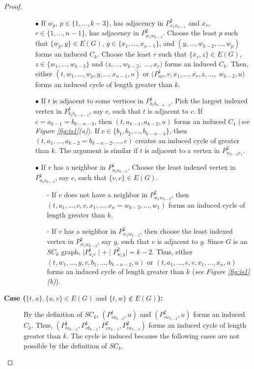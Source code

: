 \documentclass[runningheads]{llncs}
\begin{document}
\begin{proof}
\begin{description}
\begin{itemize}
\item[$\bullet$]  If $w_p$, $p \in \{1,\ldots,k-3\}$, has adjacency in $P^{2}_{x_1x_{n-1}}$ and $x_r$, $r \in\{1,\ldots, n-1\}$, has adjacency in $P^{2}_{w_1w_{k-3}}$. Choose the least $p$ such that $\{w_p,y\}\in E(G)$, $y\in \{x_1,\ldots, x_{n-1}\}$, and $(y, \ldots, w_{k-2}, \ldots, w_p)$ forms an induced $C_k$. Choose the least $r$ such that $\{x_r,z\}\in E(G)$, $z\in \{w_1,\ldots, w_{k-3}\}$ and $(z, \ldots, w_{k-2},$ $\ldots, x_r)$ forms an induced $C_k$. Then, either $(t,w_1,\ldots, w_p, y, \ldots, x_{n-1},u)$ or $(P^{1}_{uv}, v, x_1, \ldots, x_r, z, \ldots,$ $ w_{k-2}, u)$ forms an induced cycle of length greater than $k$. 

\item[$\bullet$] If $t$ is adjacent to some vertices in $P^{1}_{b_1b_{k-n-2}}$. Pick the largest indexed vertex in $P^{1}_{b_1b_{k-n-3}}$, say $c$, such that $t$ is adjacent to $c$. If $c=a_{k-1}=b_{k-n-3}$, then $(t,a_{k-1},a_{k-2},u)$ forms an induced $C_4$ (\emph{see Figure  \ref{fig:is1}(a)}). If $c \in \{b_1,b_2,\ldots,b_{k-n-4}\}$, then $(t,a_1,\ldots,a_{k-2}=b_{k-n-2}, \ldots, c)$ creates an induced cycle of greater than $k$. The argument is similar if $t$ is adjacent to a vertex in $P^{2}_{w_{k-2}x_1}$.

\item[$\bullet$] If $v$ has a neighbor in $P^{1}_{a_1a_{k-2}}$. Choose the least indexed vertex in $P^{1}_{a_1a_{k-3}}$, say $c$, such that $\{v,c\}\in E(G)$. 

\begin{itemize}
\item[-] If $v$ does not have a neighbor in $P^{2}_{w_1w_{k-2}}$, then $(t,a_1,\ldots, c, v, x_1, \ldots, x_n=w_{k-2}, \ldots, w_1)$  forms an induced cycle of length greater than $k$.
\item[-] If $v$ has a neighbor in $P^{2}_{w_1w_{k-2}}$, then choose the least indexed vertex in $P^{2}_{w_1w_{k-2}}$, say $y$, such that $v$ is adjacent to $y$. Since $G$ is an $SC_k$ graph, $\mid P^{1}_{a_1c} \mid + \mid P^{2}_{w_1y} \mid = k-2$. Thus, either $(t,w_1,\ldots, y, v, b_1, \ldots, b_{k-n-2}, u)$ or $(t, a_1,\ldots, c, v, x_1, \ldots, x_n, u)$ forms an induced cycle of length greater than $k$ (\emph{see Figure  \ref{fig:is1}(b)}).
\end{itemize}

\end{itemize}


\item[\textbf{Case ($\{t,u\},\{u,v\} \in E(G)$} and \textbf{$\{t,w\} \notin E(G)$):}]
By the definition of $SC_k$, $(P^{1}_{va_{k-2}},u)$ and $(P^{2}_{vw_{k-2}},u)$ forms an induced $C_k$. Thus, $(P^{1}_{ta_{k-2}}, P^{1}_{vb_{k-2}}, P^{2}_{vx_{k-2}}, P^{2}_{tw_{k-2}})$ forms an induced cycle of length greater than $k$. The cycle is induced because the following cases are not possible by the definition of $SC_k$.



\end{description}
\end{proof}
\end{document}
